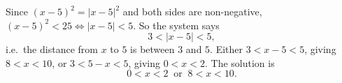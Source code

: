 Since $(x-5)^2=|x-5|^2$ and both sides are non-negative, $(x-5)^2<25\iff|x-5|<5$. So the system says
\[
3<|x-5|<5,
\]
i.e.\ the distance from $x$ to $5$ is between $3$ and $5$. Either $3<x-5<5$, giving $8<x<10$, or $3<5-x<5$, giving $0<x<2$. The solution is
\[
\boxed{0<x<2\ \text{ or }\ 8<x<10}.
\]
